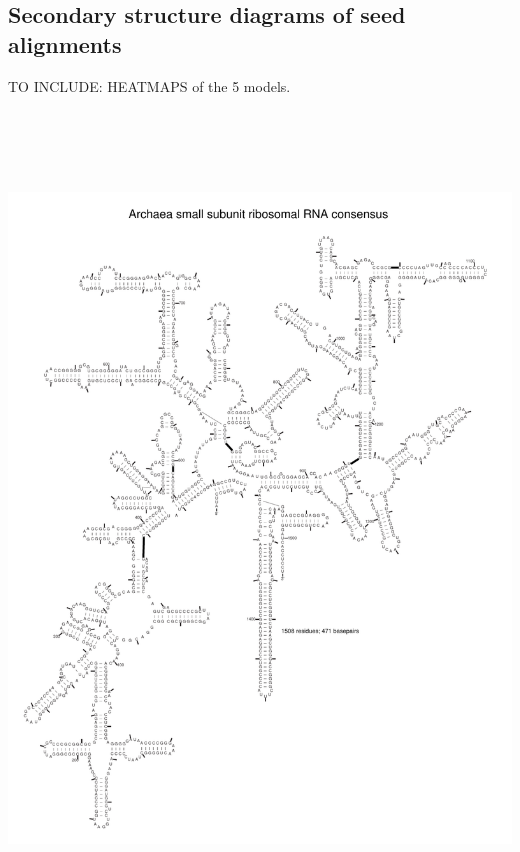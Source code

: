\subsection{Secondary structure diagrams of seed alignments}

TO INCLUDE: HEATMAPS of the 5 models.

\includegraphics[height=8.5in]{../../seeds/ss-diagrams/archaea-0p1}
